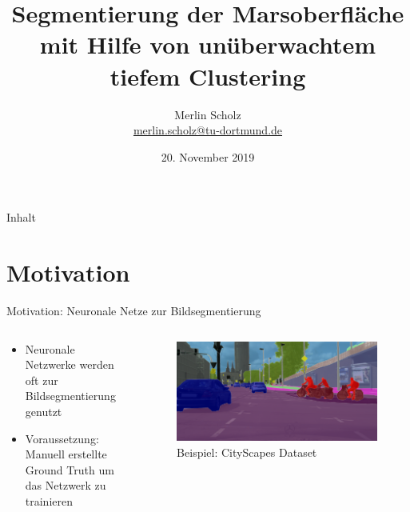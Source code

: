 \documentclass[9pt]{beamer}
\author[Merlin Scholz]{Merlin Scholz\\\href{mailto:merlin.scholz@tu-dortmund.de}{merlin.scholz@tu-dortmund.de}}
\title{Segmentierung der Marsoberfläche mit Hilfe von unüberwachtem tiefem Clustering}
\date[20.11.2019]{20. November 2019}
\institute[TU Dortmund]{Mustererkennung,\\Informatik XII, Technische Universität Dortmund}
\begin{document}
	
\begin{frame}
	
	\titlepage
	
	
	
\end{frame}

\begin{frame}{Inhalt}
	\tableofcontents
\end{frame}

\section{Motivation}

\begin{frame}{Motivation: Neuronale Netze zur Bildsegmentierung}
\begin{columns}
	\begin{column}{.5\textwidth}
		\begin{itemize}
			\item Neuronale Netzwerke werden oft zur Bildsegmentierung genutzt
			\item Voraussetzung: Manuell erstellte Ground Truth um das Netzwerk zu trainieren
			\end{itemize}
	\end{column}
	\begin{column}{.5\textwidth}
		\begin{figure}[H]
			\includegraphics[width=\textwidth,keepaspectratio]{koeln00.png}
			\caption{Beispiel: CityScapes Dataset\footnotemark[1] }
		\end{figure}
	\end{column}
\end{columns}
\end{frame}
\end{document}
